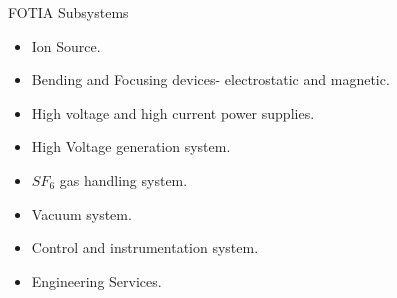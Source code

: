 \documentclass[11pt]{beamer}
\begin{document}
\begin{frame}{FOTIA Subsystems}

  \begin{itemize}
   
    \item Ion Source.
    \item Bending and Focusing devices- electrostatic and magnetic.
    \item High voltage and high current power supplies.
    \item High Voltage generation system.
    \item $SF_{6}$ gas handling system.
    \item Vacuum system.
    \item Control and instrumentation system.
    \item Engineering Services.
   \end{itemize}

\end{frame}
\end{document}
